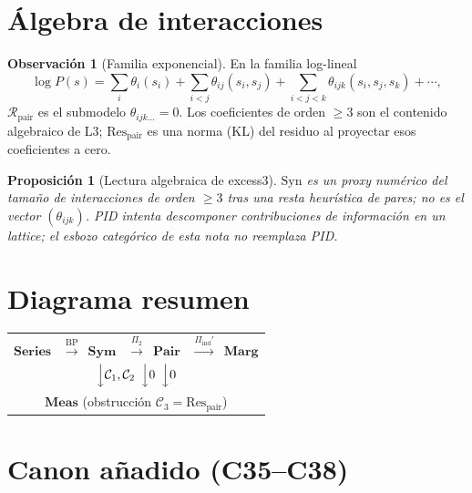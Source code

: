 \documentclass[11pt,a4paper]{article}
\theoremstyle{definition}
\newtheorem{remark}{Observaci\'on}[section]
\theoremstyle{plain}
\newtheorem{proposition}{Proposici\'on}[section]
\theoremstyle{remark}
\newcommand{\Res}{\mathrm{Res}}
\newcommand{\Rpair}{\mathcal{R}_{\mathrm{pair}}}
\newcommand{\Syn}{\mathrm{Syn}}
\begin{document}
\section{\'Algebra de interacciones}
\label{sec:alg}

\begin{remark}[Familia exponencial]
En la familia log-lineal
\begin{equation}
\log P(s)
=\sum_i\theta_i(s_i)
+\sum_{i<j}\theta_{ij}(s_i,s_j)
+\sum_{i<j<k}\theta_{ijk}(s_i,s_j,s_k)
+\cdots,
\end{equation}
$\Rpair$ es el submodelo $\theta_{ijk\ldots}=0$. Los coeficientes de
orden $\ge 3$ son el contenido algebraico de L3; $\Res_{\mathrm{pair}}$
es una norma (KL) del residuo al proyectar esos coeficientes a cero.
\end{remark}

\begin{proposition}[Lectura algebraica de excess3]
\label{prop:alg_excess}
$\Syn$ es un \emph{proxy num\'erico} del tama\~no de interacciones de
orden $\ge 3$ tras una resta heur\'istica de pares; no es el vector
$(\theta_{ijk})$. PID intenta descomponer contribuciones de informaci\'on
en un lattice; el esbozo categ\'orico de esta nota no reemplaza PID.
\end{proposition}

\section{Diagrama resumen}
\label{sec:diag}

\begin{center}
\begin{tabular}{@{}c@{}}
$\mathbf{Series}$
\ $\xrightarrow{\mathrm{BP}}$\
$\mathbf{Sym}$
\ $\xrightarrow{\Pi_2}$\
$\mathbf{Pair}$
\ $\xrightarrow{\Pi_{\mathrm{ind}}'}$\
$\mathbf{Marg}$\\[0.6em]
\hspace{3.2cm}
$\Big\downarrow \mathcal{C}_1,\mathcal{C}_2$
\hspace{0.8cm}
$\Big\downarrow 0$
\hspace{1.2cm}
$\Big\downarrow 0$\\[0.3em]
\hspace{3.2cm}
$\mathbf{Meas}$
\hspace{0.3cm}
(obstrucci\'on $\mathcal{C}_3=\Res_{\mathrm{pair}}$)
\end{tabular}
\end{center}

\section{Canon a\~nadido (C35--C38)}
\label{sec:canon}
\end{document}
